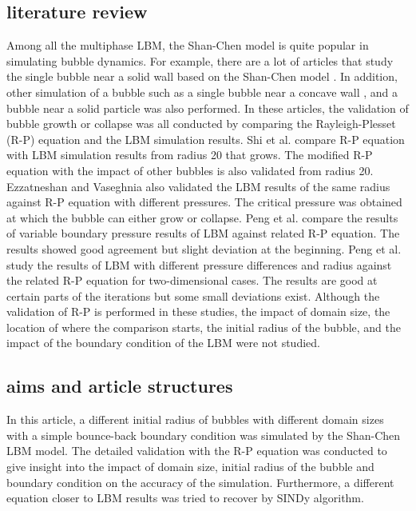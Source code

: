 \documentclass[review]{elsarticle}
\begin{document}
\subsection{literature review}
Among all the multiphase LBM, the Shan-Chen model is quite popular in simulating bubble dynamics. For example, there are a lot of articles that study the single bubble near a solid wall based on the Shan-Chen model \cite{liu2021study,袁晓龙2020numerical,mao2018study}. In addition, other simulation of a bubble such as a single bubble near a concave wall \cite{shan2021investigation}, and a bubble near a solid particle \cite{peng2020simulation} was also performed. In these articles, the validation of bubble growth or collapse was all conducted by comparing the Rayleigh-Plesset (R-P) equation and the LBM simulation results. Shi et al. \cite{shi2020numerical} compare R-P equation with LBM simulation results from radius 20 that grows. The modified R-P equation with the impact of other bubbles is also validated from radius 20. Ezzatneshan and Vaseghnia \cite{ezzatneshan2021dynamics} also validated the LBM results of the same radius against R-P equation with different pressures. The critical pressure was obtained at which the bubble can either grow or collapse. Peng et al. \cite{peng2019simulation} compare the results of variable boundary pressure results of LBM against related R-P equation. The results showed good agreement but slight deviation at the beginning. Peng et al. \cite{peng2018single} study the results of LBM with different pressure differences and radius against the related R-P equation for two-dimensional cases. The results are good at certain parts of the iterations but some small deviations exist. 
Although the validation of R-P is performed in these studies, the impact of domain size, the location of where the comparison starts, the initial radius of the bubble, and the impact of the boundary condition of the LBM were not studied. 
\subsection{aims and article structures}
In this article, a different initial radius of bubbles with different domain sizes with a simple bounce-back boundary condition was simulated by the Shan-Chen LBM model. The detailed validation with the R-P equation was conducted to give insight into the impact of domain size, initial radius of the bubble and boundary condition on the accuracy of the simulation. Furthermore, a different equation closer to LBM results was tried to recover by SINDy algorithm.    
\end{document}
